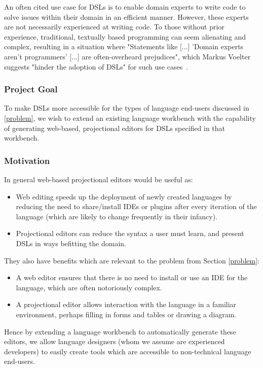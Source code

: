 \documentclass{article}
\begin{document}
An often cited use case for DSLs is to enable domain experts to write code to solve issues within their domain in an efficient manner. However, these experts are not necessarily experienced at writing code. To those without prior experience, traditional, textually based programming can seem alienating and complex, resulting in a situation where "Statements like [...] 'Domain experts aren't programmers' [...] are often-overheard prejudices", which Markus Voelter suggests "hinder the adoption of DSLs" for such use cases~\cite[pg.45]{dslEngineering}.

\subsubsection{Project Goal}\label{goal}
To make DSLs more accessible for the types of language end-users discussed in \ref{problem}, we wish to extend an existing language workbench with the capability of generating web-based, projectional editors for DSLs specified in that workbench. 

\subsubsection{Motivation}\label{motivation}
In general web-based projectional editors would be useful as:
\begin{itemize}
\item Web editing speeds up the deployment of newly created languages by reducing the need to share/install IDEs or plugins after every iteration of the language (which are likely to change frequently in their infancy). 
\item Projectional editors can reduce the syntax a user must learn, and present DSLs in ways befitting the domain.
\end{itemize} 
They also have benefits which are relevant to the problem from Section \ref{problem}:
\begin{itemize}
\item A web editor ensures that there is no need to install or use an IDE for the language, which are often notoriously complex. 
\item A projectional editor allows interaction with the language in a familiar environment, perhaps filling in forms and tables or drawing a diagram.
\end{itemize}
Hence by extending a language workbench to automatically generate these editors, we allow language designers (whom we assume are experienced developers) to easily create tools which are accessible to non-technical language end-users.
\end{document}
